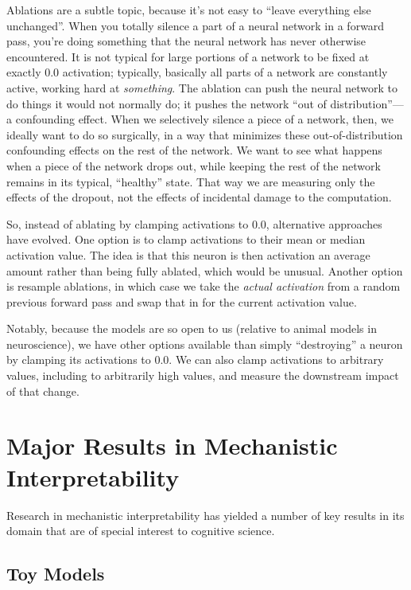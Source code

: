 Ablations are a subtle topic, because it's not easy to ``leave everything else
unchanged''. When you totally silence a part of a neural network in a forward
pass, you're doing something that the neural network has never otherwise
encountered. It is not typical for large portions of a network to be fixed at
exactly $0.0$ activation; typically, basically all parts of a network are
constantly active, working hard at \emph{something}. The ablation can push the
neural network to do things it would not normally do; it pushes the network
``out of distribution''---a confounding effect. When we selectively silence a
piece of a network, then, we ideally want to do so surgically, in a way that
minimizes these out-of-distribution confounding effects on the rest of the
network. We want to see what happens when a piece of the network drops out,
while keeping the rest of the network remains in its typical, ``healthy''
state. That way we are measuring only the effects of the dropout, not the
effects of incidental damage to the computation.

So, instead of ablating by clamping activations to $0.0$, alternative
approaches have evolved. One option is to clamp activations to their mean or
median activation value. The idea is that this neuron is then activation an
average amount rather than being fully ablated, which would be unusual. Another
option is resample ablations, in which case we take the \emph{actual
activation} from a random previous forward pass and swap that in for the
current activation value.

Notably, because the models are so open to us (relative to animal models in
neuroscience), we have other options available than simply ``destroying'' a
neuron by  clamping its activations to  $0.0$. We can also clamp activations to
arbitrary values, including to arbitrarily high values, and measure the
downstream impact of that change.

\section{Major Results in Mechanistic Interpretability}

Research in mechanistic interpretability has yielded a number of key results in
its domain that are of special interest to cognitive science.

\subsection{Toy Models}

